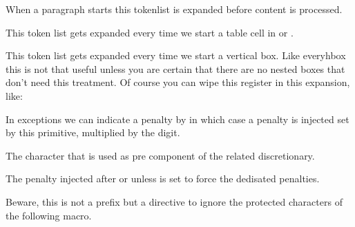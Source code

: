 \stopnewprimitive

\startoldprimitive[title={\prm {everypar}}]

When a paragraph starts this tokenlist is expanded before content is processed.

\stopoldprimitive

\startnewprimitive[title={\prm {everytab}}]

This token list gets expanded every time we start a table cell in  or
.

\stopnewprimitive

\startoldprimitive[title={\prm {everyvbox}}]

This token list gets expanded every time we start a vertical box. Like \prm
{everyhbox} this is not that useful unless you are certain that there are no
nested boxes that don't need this treatment. Of course you can wipe this register
in this expansion, like:

\starttyping
\everyvbox{\kern10pt\everyvbox{}}
\stoptyping

\stopoldprimitive


\startnewprimitive[title={\prm {exceptionpenalty}}]

In exceptions we can indicate a penalty by \type {[digit]} in which case a
penalty is injected set by this primitive, multiplied by the digit.

\stopnewprimitive

\startoldprimitive[title={\prm {exhyphenchar}}]

The character that is used as pre component of the related discretionary.

\stopoldprimitive

\startoldprimitive[title={\prm {exhyphenpenalty}}]

The penalty injected after \type {-} or \type {\-} unless 
is set to force the dedisated penalties.

\stopoldprimitive

\startnewprimitive[title={\prm {expand}}]

Beware, this is not a prefix but a directive to ignore the protected characters of
the following macro.

\startbuffer
\protected \def \testa{\the\scratchcounter}
           \edef\testb{\testa}
           \edef\testc{\expand\testa}
\stopbuffer

\typebuffer

